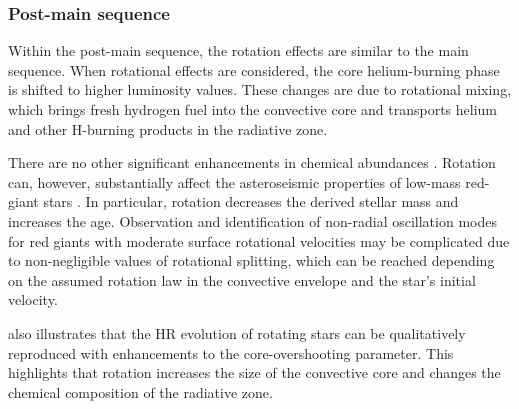 \subsubsection{Post-main sequence}
Within the post-main sequence, the rotation effects are similar to the main sequence.
When rotational effects are considered, the core helium-burning phase is shifted to higher luminosity values. 
These changes are due to rotational mixing, which brings fresh hydrogen fuel into the convective core and transports helium and other H-burning products in the radiative zone.

There are no other significant enhancements in chemical abundances \citep[See Table 2. in][]{lagarde_thermohaline_2012}.
Rotation can, however, substantially affect the asteroseismic properties of low-mass red-giant stars
\citet{lagarde_thermohaline_2012, eggenberger_effects_2010}.
In particular, rotation decreases the derived stellar mass and increases the age.
Observation and identification of non-radial oscillation modes for red giants with moderate surface rotational velocities may be complicated due to non-negligible values of rotational splitting, which can be reached depending on the assumed rotation law in the convective envelope and the star's initial velocity.

\citep{eggenberger_effects_2010, lagarde_thermohaline_2012} also illustrates that the HR evolution of rotating stars can be qualitatively reproduced with enhancements to the core-overshooting parameter. 
This highlights that rotation increases the size of the convective core and changes the chemical composition of the radiative zone.


